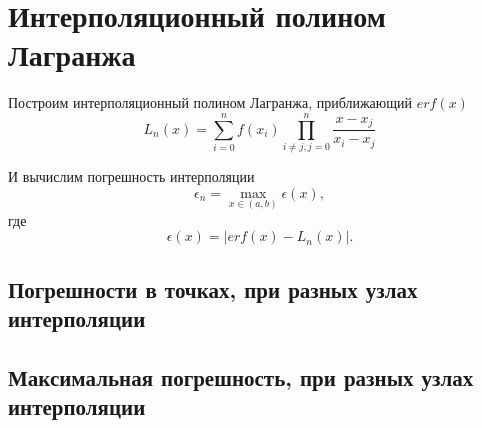\section{Интерполяционный полином Лагранжа}

Построим интерполяционный полином Лагранжа, приближающий $erf(x)$
$$
	L_n(x)=\sum\limits_{i=0}^{n}f(x_i)\prod\limits_{i \neq j, j = 0}^{n} \frac{x - x_j}{x_i-x_j}
$$

И вычислим погрешность интерполяции
$$
	\epsilon_n = \max\limits_{x \in (a, b)} \epsilon(x),
$$
где
$$
	\epsilon(x)	= \left| erf(x) - L_n(x)\right|.
$$

\subsection{Погрешности в точках, при разных узлах интерполяции}


\subsection{Максимальная погрешность, при разных узлах интерполяции}
